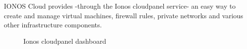 IONOS Cloud provides -through the Ionos cloudpanel service- an easy way to create and manage virtual machines, firewall rules, private networks and various other infrastructure components.
\begin{figure}[H]
    \centering
    \caption{Ionos cloudpanel dashboard}
    \label{fig:image-of-ionos-cloudpanel-dashboard}
\end{figure}

